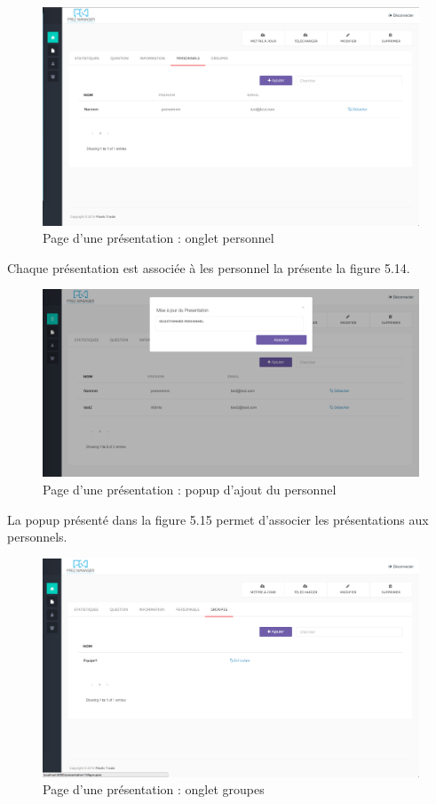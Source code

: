 \documentclass[12pt, ChapStyle1, oneside]{./Styles/Dea_Gsm}
\begin{document}
\begin{figure}[H]
    \centering
    \includegraphics[width=6in]{screenshots/web/prezpersonnel}
    \caption{Page d'une présentation : onglet personnel}

\end{figure}

Chaque présentation est associée à les personnel la présente la figure 5.14.

\begin{figure}[H]
    \centering
    \includegraphics[width=6in]{screenshots/web/popuppersonnel}
    \caption{Page d'une présentation : popup d'ajout du personnel}

\end{figure}

La popup présenté dans la figure 5.15 permet d'associer les présentations aux personnels. 


\begin{figure}[H]
    \centering
    \includegraphics[width=6in]{screenshots/web/prezgroupe}
    \caption{Page d'une présentation : onglet groupes}

\end{figure}
\end{document}
